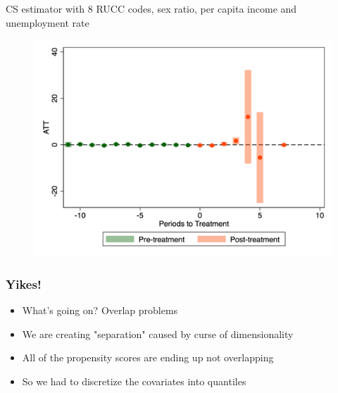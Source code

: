 \documentclass{beamer}
\begin{document}
\begin{frame}{CS estimator with 8 RUCC codes, sex ratio, per capita income and unemployment rate}

\begin{figure}
    \centering
    \includegraphics[height=0.85\textheight]{./lecture_includes/lasso_br1544}
\end{figure}

\end{frame}

\begin{frame}
\frametitle{Yikes!}

\begin{itemize}
\item What's going on?  Overlap problems
\item We are creating "separation" caused by curse of dimensionality
\item All of the propensity scores are ending up not overlapping
\item So we had to discretize the covariates into quantiles
\end{itemize}

\end{frame}
\end{document}
